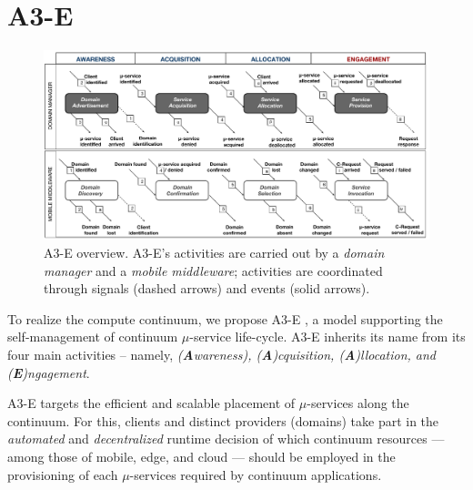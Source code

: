 \section{A3-E}\label{sec:A3-E}

\begin{figure}[tbp]
	\includegraphics[width=1\textwidth]{figs/A3-E-process}
	\caption{A3-E overview. A3-E's activities are carried out by a \textit{domain manager} and a \textit{mobile middleware}; activities are coordinated through signals (dashed arrows) and events (solid arrows).}
	\label{fig:A3-E-process}
\end{figure}



To realize the compute continuum, we propose A3-E
, a model supporting the self-management of continuum $\mu$-service life-cycle. A3-E inherits its name from its four main activities -- namely, \textit{(\textbf{A}wareness), (\textbf{A})cquisition, (\textbf{A})llocation, and (\textbf{E})ngagement}. 


A3-E targets the efficient and scalable placement of $\mu$-services along the continuum. For this, clients and distinct providers (domains) take part in the \textit{automated} and \textit{decentralized} runtime decision of which continuum resources --- among those of mobile, edge, and cloud --- should be employed in the provisioning of each $\mu$-services required by continuum applications.

